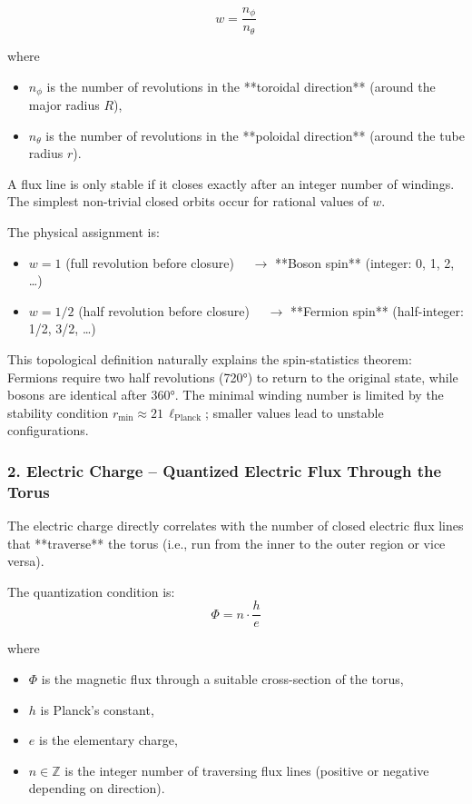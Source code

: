 \begin{equation}
	w = \frac{n_\phi}{n_\theta}
	\label{eq:winding_number}
\end{equation}

where
\begin{itemize}
	\item $n_\phi$ is the number of revolutions in the **toroidal direction** (around the major radius $R$),
	\item $n_\theta$ is the number of revolutions in the **poloidal direction** (around the tube radius $r$).
\end{itemize}

A flux line is only stable if it closes exactly after an integer number of windings. The simplest non-trivial closed orbits occur for rational values of $w$.

The physical assignment is:
\begin{itemize}
	\item $w = 1$ \quad (full revolution before closure) $\quad \to$ **Boson spin** (integer: 0, 1, 2, …)
	\item $w = 1/2$ \quad (half revolution before closure) $\quad \to$ **Fermion spin** (half-integer: 1/2, 3/2, …)
\end{itemize}

This topological definition naturally explains the spin-statistics theorem: Fermions require two half revolutions (720°) to return to the original state, while bosons are identical after 360°. The minimal winding number is limited by the stability condition $r_{\min} \approx 21 \, \ell_{\text{Planck}}$; smaller values lead to unstable configurations.

\subsubsection{2. Electric Charge – Quantized Electric Flux Through the Torus}

The electric charge directly correlates with the number of closed electric flux lines that **traverse** the torus (i.e., run from the inner to the outer region or vice versa).

The quantization condition is:
\begin{equation}
	\Phi = n \cdot \frac{h}{e}
	\label{eq:flux_quantization}
\end{equation}

where
\begin{itemize}
	\item $\Phi$ is the magnetic flux through a suitable cross-section of the torus,
	\item $h$ is Planck's constant,
	\item $e$ is the elementary charge,
	\item $n \in \mathbb{Z}$ is the integer number of traversing flux lines (positive or negative depending on direction).
\end{itemize}

